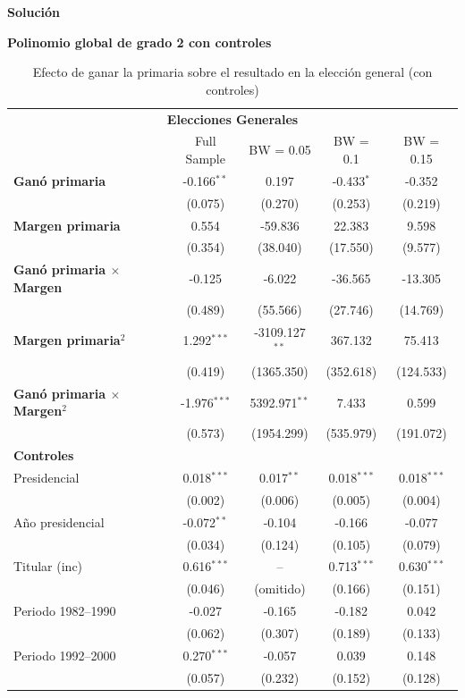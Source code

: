 \documentclass[a4paper, answers, addpoints, 11pt]{exam}
\newenvironment{solucion}{%
  \begin{mdframed}[
    backgroundcolor=blue!5,    %
    linecolor=blue!50,          %
    linewidth=2pt,              %
    leftmargin=10pt,            %
    rightmargin=8pt,           %
    topline=true,              %
    bottomline=true,            %
    roundcorner=10pt,           %
    innerleftmargin=10pt,       %
    innerrightmargin=10pt,      %
    innerbottommargin=10pt,     %
    innertopmargin=10pt         %
  ]%
  \begin{tcolorbox}[colframe=blue!50!black, colback=blue!50, coltitle=white, sharp corners=all, boxrule=1mm, width=\textwidth, halign=left, valign=center, top=0mm, bottom=0mm, left=0mm, right=0mm] \textbf{Solución} \end{tcolorbox} }{\end{mdframed}}
\begin{document}
\begin{enumerate}[resume]
\begin{enumerate}
\begin{solucion}
\textbf{Polinomio global de grado 2 con controles}\\
\begin{table}[H]\centering
\caption{Efecto de ganar la primaria sobre el resultado en la elección general (con controles)}
\label{tab:rd_controls_full}
\footnotesize
\begin{tabular}{lcccc}
\toprule
\multicolumn{5}{c}{\textbf{Elecciones Generales}} \\
\cmidrule(lr){2-5}
& Full Sample & BW = 0.05 & BW = 0.1 & BW = 0.15  \\
\midrule
\textbf{Ganó primaria} & -0.166$^{**}$ & 0.197 & -0.433$^{*}$ & -0.352 \\
 & (0.075) & (0.270) & (0.253) & (0.219) \\
\textbf{Margen primaria} & 0.554 & -59.836 & 22.383 & 9.598 \\
 & (0.354) & (38.040) & (17.550) & (9.577) \\
\textbf{Ganó primaria $\times$ Margen} & -0.125 & -6.022 & -36.565 & -13.305 \\
 & (0.489) & (55.566) & (27.746) & (14.769) \\
\textbf{Margen primaria$^2$} & 1.292$^{***}$ & -3109.127$^{**}$ & 367.132 & 75.413 \\
 & (0.419) & (1365.350) & (352.618) & (124.533) \\
\textbf{Ganó primaria $\times$ Margen$^2$} & -1.976$^{***}$ & 5392.971$^{**}$ & 7.433 & 0.599 \\
 & (0.573) & (1954.299) & (535.979) & (191.072) \\
\midrule
\textbf{Controles} \\
Presidencial & 0.018$^{***}$ & 0.017$^{**}$ & 0.018$^{***}$ & 0.018$^{***}$ \\
 & (0.002) & (0.006) & (0.005) & (0.004) \\
Año presidencial & -0.072$^{**}$ & -0.104 & -0.166 & -0.077 \\
 & (0.034) & (0.124) & (0.105) & (0.079) \\
Titular (inc) & 0.616$^{***}$ & -- & 0.713$^{***}$ & 0.630$^{***}$ \\
 & (0.046) & (omitido) & (0.166) & (0.151) \\
Periodo 1982--1990 & -0.027 & -0.165 & -0.182 & 0.042 \\
 & (0.062) & (0.307) & (0.189) & (0.133) \\
Periodo 1992--2000 & 0.270$^{***}$ & -0.057 & 0.039 & 0.148 \\
 & (0.057) & (0.232) & (0.152) & (0.128) \\

\end{tabular}
\end{table}
\end{solucion}
\end{enumerate}
\end{enumerate}
\end{document}
